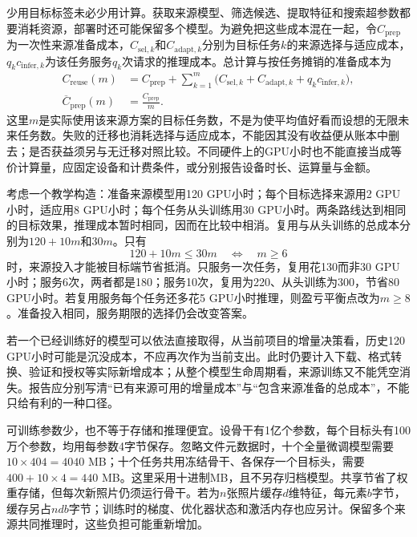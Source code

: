 少用目标标签未必少用计算。获取来源模型、筛选候选、提取特征和搜索超参数都要消耗资源，部署时还可能保留多个模型。为避免把这些成本混在一起，令$C_{\mathrm{prep}}$为一次性来源准备成本，$C_{\mathrm{sel},k}$和$C_{\mathrm{adapt},k}$分别为目标任务$k$的来源选择与适应成本，$q_kc_{\mathrm{infer},k}$为该任务服务$q_k$次请求的推理成本。总计算与按任务摊销的准备成本为
\begin{equation}
  \begin{aligned}
    C_{\mathrm{reuse}}(m)
    &=C_{\mathrm{prep}}+
      \sum_{k=1}^{m}
      \bigl(C_{\mathrm{sel},k}+C_{\mathrm{adapt},k}
      +q_kc_{\mathrm{infer},k}\bigr),\\
    \overline C_{\mathrm{prep}}(m)&=\frac{C_{\mathrm{prep}}}{m}.
  \end{aligned}
  \label{eq:ket-reuse-amortization}
\end{equation}
这里$m$是实际使用该来源方案的目标任务数，不是为使平均值好看而设想的无限未来任务数。失败的迁移也消耗选择与适应成本，不能因其没有收益便从账本中删去；是否获益须另与无迁移对照比较。不同硬件上的GPU小时也不能直接当成等价计算量，应固定设备和计费条件，或分别报告设备时长、运算量与金额。

考虑一个教学构造：准备来源模型用120 GPU小时；每个目标选择来源用2 GPU小时，适应用8 GPU小时；每个任务从头训练用30 GPU小时。两条路线达到相同的目标效果，推理成本暂时相同，因而在比较中相消。复用与从头训练的总成本分别为$120+10m$和$30m$。只有
\begin{equation}
  120+10m\leq30m
  \quad\Longleftrightarrow\quad m\geq6
  \label{eq:ket-reuse-break-even}
\end{equation}
时，来源投入才能被目标端节省抵消。只服务一次任务，复用花130而非30 GPU小时；服务6次，两者都是180；服务10次，复用为220、从头训练为300，节省80 GPU小时。若复用服务每个任务还多花5 GPU小时推理，则盈亏平衡点改为$m\geq8$。准备投入相同，服务期限的选择仍会改变答案。

若一个已经训练好的模型可以依法直接取得，从当前项目的增量决策看，历史120 GPU小时可能是沉没成本，不应再次作为当前支出。此时仍要计入下载、格式转换、验证和授权等实际新增成本；从整个模型生命周期看，来源训练又不能凭空消失。报告应分别写清“已有来源可用的增量成本”与“包含来源准备的总成本”，不能只给有利的一种口径。

可训练参数少，也不等于存储和推理便宜。设骨干有1亿个参数，每个目标头有100万个参数，均用每参数4字节保存。忽略文件元数据时，十个全量微调模型需要$10\times404=4040$ MB；十个任务共用冻结骨干、各保存一个目标头，需要$400+10\times4=440$ MB。这里采用十进制MB，且不另存归档模型。共享节省了权重存储，但每次新照片仍须运行骨干。若为$n$张照片缓存$d$维特征，每元素$b$字节，缓存另占$ndb$字节；训练时的梯度、优化器状态和激活内存也应另计。保留多个来源共同推理时，这些负担可能重新增加。

